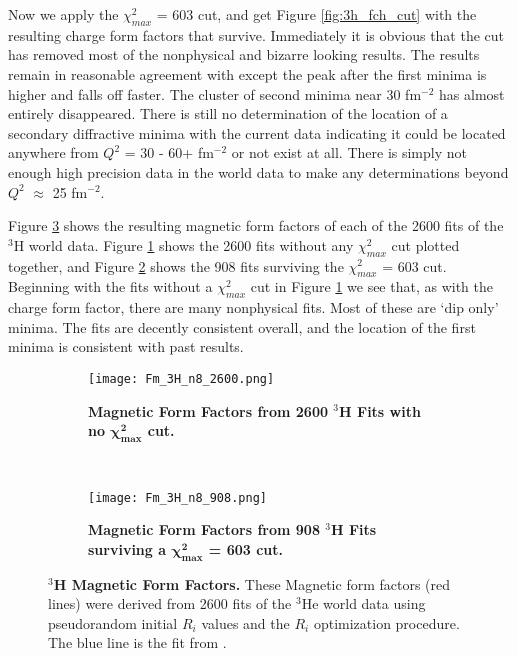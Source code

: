 Now we apply the $\chi^2_{max}$ = 603 cut, and get Figure \ref{fig:3h_fch_cut} with the resulting charge form factors that survive. Immediately it is obvious that the cut has removed most of the nonphysical and bizarre looking results. The results remain in reasonable agreement with \cite{Article:Amroun} except the peak after the first minima is higher and falls off faster. The cluster of second minima near 30 fm$^{-2}$ has almost entirely disappeared. There is still no determination of the location of a secondary diffractive minima with the current data indicating it could be located anywhere from  $Q^2$ = 30 - 60+ fm$^{-2}$ or not exist at all. There is simply not enough high precision data in the world data to make any determinations beyond $Q^2$ $\approx$ 25 fm$^{-2}$.

Figure \ref{fig:3h_fm} shows the resulting magnetic form factors of each of the 2600 fits of the $^3$H world data. Figure \ref{fig:3h_fm_no_cut} shows the 2600 fits without any $\chi^2_{max}$ cut plotted together, and Figure \ref{fig:3h_fm_cut} shows the 908 fits surviving the $\chi^2_{max}$ = 603 cut. Beginning with the fits without a $\chi^2_{max}$ cut in Figure \ref{fig:3h_fm_no_cut} we see that, as with the charge form factor, there are many nonphysical fits. Most of these are `dip only' minima. The fits are decently consistent overall, and the location of the first minima is consistent with past results. 

\begin{figure}[!ht]
\begin{subfigure}{1.\textwidth}
  \centering
  \texttt{[image: Fm\_3H\_n8\_2600.png]}
  \caption{\bf{Magnetic Form Factors from 2600 $^3$H Fits with no $\boldsymbol{\chi^2_{max}}$ cut.}}
  \label{fig:3h_fm_no_cut}
\end{subfigure}\\
\begin{subfigure}{1.\textwidth}
  \centering
  \texttt{[image: Fm\_3H\_n8\_908.png]}
  \caption{\bf{Magnetic Form Factors from 908 $^3$H Fits surviving a $\boldsymbol{\chi^2_{max}}$ = 603 cut.}}
  \label{fig:3h_fm_cut}
\end{subfigure}
\caption[$^3$H Magnetic Form Factors] {
{\bf{$^3$H Magnetic Form Factors.}} These Magnetic form factors (red lines) were derived from 2600 fits of the $^3$He world data using pseudorandom initial $R_i$ values and the $R_i$ optimization procedure. The blue line is the fit from \cite{Article:Amroun}.}
\label{fig:3h_fm}
\end{figure}

